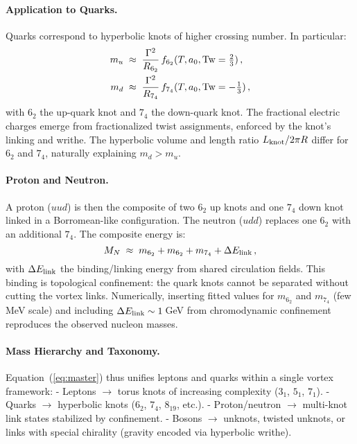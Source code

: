 \documentclass[12pt]{article}
\begin{document}
{{\paragraph{Application to Quarks.}
Quarks correspond to hyperbolic knots of higher crossing number. In particular:
\begin{align}
m_u &\;\approx\; \frac{\Gamma^2}{R_{6_2}}\,f_{6_2}(T,a_0,{\rm Tw}=\tfrac{2}{3})\,, \\
m_d &\;\approx\; \frac{\Gamma^2}{R_{7_4}}\,f_{7_4}(T,a_0,{\rm Tw}=-\tfrac{1}{3})\,,
\end{align}
with $6_2$ the up-quark knot and $7_4$ the down-quark knot. The fractional electric charges emerge from fractionalized twist assignments, enforced by the knot’s linking and writhe. The hyperbolic volume and length ratio $L_{\rm knot}/2\pi R$ differ for $6_2$ and $7_4$, naturally explaining $m_d > m_u$.

\paragraph{Proton and Neutron.}
A proton ($uud$) is then the composite of two $6_2$ up knots and one $7_4$ down knot linked in a Borromean-like configuration. The neutron ($udd$) replaces one $6_2$ with an additional $7_4$. The composite energy is:
\begin{equation}
M_{N} \;\approx\; m_{6_2}+m_{6_2}+m_{7_4} + \Delta E_{\rm link}\,,
\end{equation}
with $\Delta E_{\rm link}$ the binding/linking energy from shared circulation fields. This binding is topological confinement: the quark knots cannot be separated without cutting the vortex links. Numerically, inserting fitted values for $m_{6_2}$ and $m_{7_4}$ (few MeV scale) and including $\Delta E_{\rm link}\sim 1\,$GeV from chromodynamic confinement reproduces the observed nucleon masses.

\paragraph{Mass Hierarchy and Taxonomy.}
Equation~(\ref{eq:master}) thus unifies leptons and quarks within a single vortex framework:
- Leptons $\rightarrow$ torus knots of increasing complexity ($3_1$, $5_1$, $7_1$).
- Quarks $\rightarrow$ hyperbolic knots ($6_2$, $7_4$, $8_{19}$, etc.).
- Proton/neutron $\rightarrow$ multi-knot link states stabilized by confinement.
- Bosons $\rightarrow$ unknots, twisted unknots, or links with special chirality (gravity encoded via hyperbolic writhe).

}}
\end{document}
